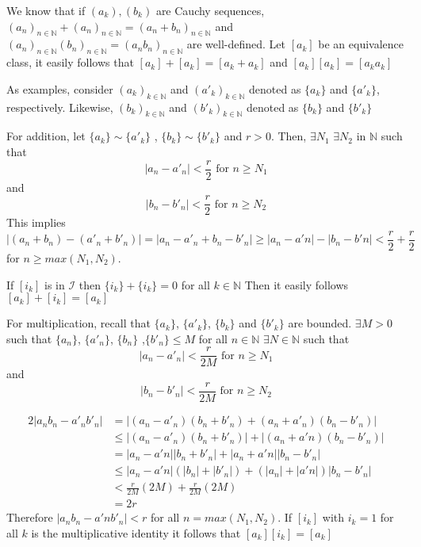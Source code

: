 \documentclass{tufte-book}
\theoremstyle{mytheoremstyle}
\theoremstyle{mylemstyle}
\newtheorem*{lem}{Lem.}
\theoremstyle{mydefstyle}
\begin{document}
We know that if $(a_k),(b_k)$ are Cauchy sequences, $(a_n)_{n \in \mathbb{N}} +(a_n)_{n \in \mathbb{N}}=(a_n + b_n)_{n \in \mathbb{N}}$ and $(a_n)_{n \in \mathbb{N}}(b_n)_{n \in \mathbb{N}}=(a_nb_n)_{n \in \mathbb{N}}$ are well-defined.
Let $[a_k]$ be an equivalence class, it easily follows that $[a_k]+[a_k] = [a_k+a_k]$ and $[a_k][a_k] = [a_k a_k]$

As examples, consider $(a_k)_{k \in \mathbb{N}}$ and $(a'_k)_{k \in \mathbb{N}}$ denoted as $\{a_k\}$ and $\{a'_k\}$, respectively. Likewise, $(b_k)_{k \in \mathbb{N}}$ and $(b'_k)_{k \in \mathbb{N}}$ denoted as $\{b_k\}$ and $\{b'_k\}$  

For addition, let $\{a_k\} \sim \{a'_k\}$ , $\{b_k\} \sim \{b'_k\}$ and $r>0$.  Then, $\exists N_1$ $\exists N_2$ in $\mathbb{N}$ such that
\[|a_n-a'_n| < \frac{r}{2} \text{ for } n \geq N_1 \]
and
\[|b_n-b'_n| < \frac{r}{2} \text{ for } n \geq N_2 \]
This implies
\[|(a_n+b_n) - (a'_n + b'_n)| = |a_n - a'_n + b_n - b'_n| \geq |a_n-a'n| - |b_n - b'n| < \frac{r}{2} + \frac{r}{2} \] 
for $n \geq max(N_1,N_2)$.

If $[i_k]$ is in $\mathcal{I}$ then $\{i_k\}+\{i_k\}=0$ for all $k \in \mathbb{N}$ Then it easily follows $[a_k] + [i_k] = [a_k]$

For multiplication, recall that $\{a_k\}$, $\{a'_k\}$, $\{b_k\}$ and $\{b'_k\}$ are bounded. $\exists M >0$ such that  $\{a_n\}$, $\{a'_n\}$, $\{b_n\}$ ,$\{b'_n\} \leq M$ for all $n \in \mathbb{N}$ $\exists N \in \mathbb{N}$ such that
\[|a_n - a'_n| < \frac{r}{2M} \text{ for } n \geq N_1 \]
and
\[|b_n - b'_n| < \frac{r}{2M} \text{ for } n \geq N_2 \]

\begin{align*}
2|a_nb_n - a'_nb'_n| & = |(a_n-a'_n)(b_n+b'_n) + (a_n+a'_n)(b_n-b'_n)|
\\& \leq |(a_n-a'_n)(b_n+b'_n)| + |(a_n+a'n)(b_n-b'_n)|
\\& = |a_n-a'n||b_n+b'_n| + |a_n+a'n||b_n-b'_n|
\\& \leq |a_n-a'n|(|b_n|+|b'_n|) + (|a_n|+|a'n|)|b_n-b'_n|
\\& < \frac{r}{2M}(2M) + \frac{r}{2M}(2M)
\\& = 2r
\end{align*}
Therefore $|a_nb_n - a'nb'_n| < r$ for all $n = max(N_1,N_2)$.  If $[i_k]$  with $i_k=1$ for all $k$ is the multiplicative identity it follows that $[a_k][i_k] = [a_k]$
\end{document}
